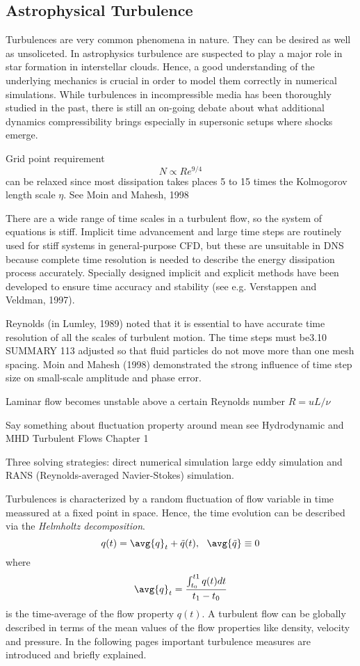 \subsection{Astrophysical Turbulence}

Turbulences are very common phenomena in nature. They can be desired as well as
unsoliceted. In astrophysics turbulence are suspected to play a major role in
star formation in interstellar clouds. Hence, a good understanding of the
underlying mechanics is crucial in order to model them correctly in numerical
simulations. While turbulences in incompressible media has been thoroughly
studied in the past, there is still an on-going debate about what additional
dynamics compressibility brings especially in supersonic setups where shocks
emerge.

Grid point requirement
\begin{equation}
    N \varpropto Re^{9/4}
\end{equation}
can be relaxed since most dissipation takes places 5 to 15 times the
Kolmogorov length scale $\eta$. See Moin and Mahesh, 1998

There are a wide range of time scales in a turbulent flow, so the system of
equations is stiff. Implicit time advancement and large time steps are
routinely used for stiff systems in general-purpose CFD, but these are
unsuitable in DNS because complete time resolution is needed to describe
the energy dissipation process accurately. Specially designed implicit and
explicit methods have been developed to ensure time accuracy and stability
(see e.g. Verstappen and Veldman, 1997).

Reynolds (in Lumley, 1989) noted that it is essential to have accurate time
resolution of all the scales of turbulent motion. The time steps must be3.10 SUMMARY
113
adjusted so that fluid particles do not move more than one mesh spacing.
Moin and Mahesh (1998) demonstrated the strong influence of time step size
on small-scale amplitude and phase error.


Laminar flow becomes unstable above a certain Reynolds number $R = u L/\nu$

Say something about fluctuation property around mean
see Hydrodynamic and MHD Turbulent Flows Chapter 1

Three solving strategies: direct numerical simulation
large eddy simulation and RANS (Reynolds-averaged Navier-Stokes) simulation.

Turbulences is characterized by a random fluctuation of flow variable in time
meassured at a fixed point in space. Hence, the time evolution can be described
via the \emph{Helmholtz decomposition}.
\begin{equation}
    q(t) = \avg{q}_t + \tilde{q}(t), \ \ \avg{\tilde{q}} \equiv 0
\end{equation}
where 
\begin{equation}
    \avg{q}_t = \frac{\int_{t_0}^{t1} q(t) dt}{t_1 - t_0}
\end{equation}
is the time-average of the flow property $q(t)$. A turbulent flow can be
globally described in terms of the mean values of the flow properties like
density, velocity and pressure. In the following pages important turbulence
measures are introduced and briefly explained.

